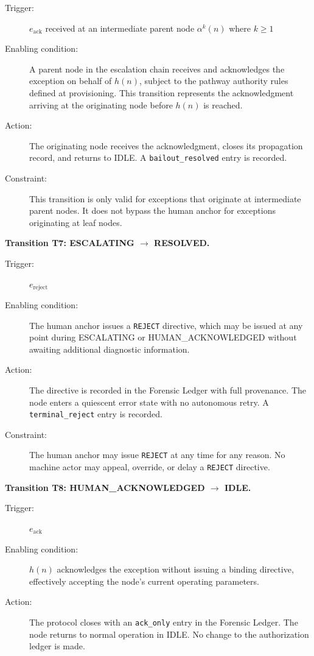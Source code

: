 \begin{description}
\item[Trigger:] $e_{\text{ack}}$ received at an intermediate parent node $\alpha^k(n)$ where $k \geq 1$
\item[Enabling condition:] A parent node in the escalation chain receives and acknowledges the exception on behalf of $h(n)$, subject to the pathway authority rules defined at provisioning. This transition represents the acknowledgment arriving at the originating node before $h(n)$ is reached.
\item[Action:] The originating node receives the acknowledgment, closes its propagation record, and returns to IDLE. A \texttt{bailout\_resolved} entry is recorded.
\item[Constraint:] This transition is only valid for exceptions that originate at intermediate parent nodes. It does not bypass the human anchor for exceptions originating at leaf nodes.
\end{description}

\bigskip
\noindent\textbf{Transition T7: ESCALATING $\rightarrow$ RESOLVED.}

\begin{description}
\item[Trigger:] $e_{\text{reject}}$
\item[Enabling condition:] The human anchor issues a \texttt{REJECT} directive, which may be issued at any point during ESCALATING or HUMAN\_ACKNOWLEDGED without awaiting additional diagnostic information.
\item[Action:] The directive is recorded in the Forensic Ledger with full provenance. The node enters a quiescent error state with no autonomous retry. A \texttt{terminal\_reject} entry is recorded.
\item[Constraint:] The human anchor may issue \texttt{REJECT} at any time for any reason. No machine actor may appeal, override, or delay a \texttt{REJECT} directive.
\end{description}

\bigskip
\noindent\textbf{Transition T8: HUMAN\_ACKNOWLEDGED $\rightarrow$ IDLE.}

\begin{description}
\item[Trigger:] $e_{\text{ack}}$
\item[Enabling condition:] $h(n)$ acknowledges the exception without issuing a binding directive, effectively accepting the node's current operating parameters.
\item[Action:] The protocol closes with an \texttt{ack\_only} entry in the Forensic Ledger. The node returns to normal operation in IDLE. No change to the authorization ledger is made.
\end{description}

